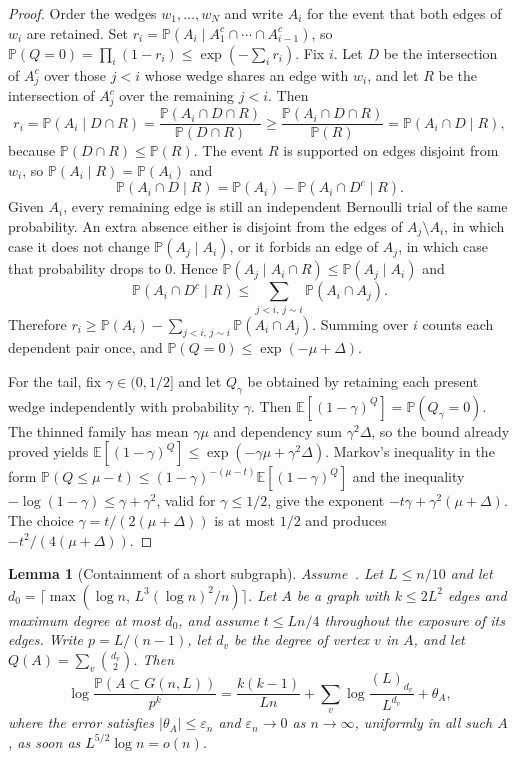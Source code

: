 \documentclass[11pt]{article}
\newtheorem{lemma}[theorem]{Lemma}
\newcommand{\EE}{\mathbb{E}}
\newcommand{\PP}{\mathbb{P}}
\begin{document}
\begin{proof}
Order the wedges \(w_1,\ldots,w_N\) and write \(A_i\) for the event that both
edges of \(w_i\) are retained. Set
\(r_i=\PP(A_i\mid A_1^c\cap\cdots\cap A_{i-1}^c)\), so
\(\PP(Q=0)=\prod_i(1-r_i)\le\exp(-\sum_i r_i)\).
Fix \(i\). Let \(D\) be the intersection of \(A_j^c\) over those \(j<i\) whose
wedge shares an edge with \(w_i\), and let \(R\) be the intersection of
\(A_j^c\) over the remaining \(j<i\). Then
\[
r_i=\PP(A_i\mid D\cap R)
=\frac{\PP(A_i\cap D\cap R)}{\PP(D\cap R)}
\ge\frac{\PP(A_i\cap D\cap R)}{\PP(R)}
=\PP(A_i\cap D\mid R),
\]
because \(\PP(D\cap R)\le\PP(R)\). The event \(R\) is supported on edges
disjoint from \(w_i\), so \(\PP(A_i\mid R)=\PP(A_i)\) and
\[
\PP(A_i\cap D\mid R)=\PP(A_i)-\PP(A_i\cap D^c\mid R).
\]
Given \(A_i\), every remaining edge is still an independent Bernoulli trial of
the same probability. An extra absence either is disjoint from the edges of
\(A_j\setminus A_i\), in which case it does not change \(\PP(A_j\mid A_i)\),
or it forbids an edge of \(A_j\), in which case that probability drops to \(0\).
Hence \(\PP(A_j\mid A_i\cap R)\le\PP(A_j\mid A_i)\) and
\[
\PP(A_i\cap D^c\mid R)
\le\sum_{j<i,\,j\sim i}\PP(A_i\cap A_j).
\]
Therefore \(r_i\ge\PP(A_i)-\sum_{j<i,\,j\sim i}\PP(A_i\cap A_j)\).
Summing over \(i\) counts each dependent pair once, and
\(\PP(Q=0)\le\exp(-\mu+\Delta)\).

For the tail, fix \(\gamma\in(0,1/2]\) and let \(Q_\gamma\) be obtained by
retaining each present wedge independently with probability \(\gamma\).
Then \(\EE[(1-\gamma)^Q]=\PP(Q_\gamma=0)\). The thinned family has mean
\(\gamma\mu\) and dependency sum \(\gamma^2\Delta\), so the bound already
proved yields \(\EE[(1-\gamma)^Q]\le\exp(-\gamma\mu+\gamma^2\Delta)\).
Markov's inequality in the form
\(\PP(Q\le\mu-t)\le(1-\gamma)^{-(\mu-t)}\EE[(1-\gamma)^Q]\) and the inequality
\(-\log(1-\gamma)\le\gamma+\gamma^2\), valid for \(\gamma\le 1/2\), give the
exponent
\(-t\gamma+\gamma^2(\mu+\Delta)\).
The choice \(\gamma=t/(2(\mu+\Delta))\) is at most \(1/2\) and produces
\(-t^2/(4(\mu+\Delta))\).
\end{proof}

\begin{lemma}[Containment of a short subgraph]
\label{lem:contain-short}
Assume~\cite[Theorem~6]{Gao20}. Let \(L\le n/10\) and let
\(d_0=\lceil\max(\log n,\, L^3(\log n)^2/n)\rceil\). Let \(A\) be a graph with
\(k\le 2L^2\) edges and maximum degree at most \(d_0\), and assume \(t\le Ln/4\)
throughout the exposure of its edges. Write \(p=L/(n-1)\), let \(d_v\) be the
degree of vertex \(v\) in \(A\), and let \(Q(A)=\sum_v\binom{d_v}{2}\). Then
\[
\log\frac{\PP(A\subset G(n,L))}{p^k}
=
\frac{k(k-1)}{Ln}+\sum_v\log\frac{(L)_{d_v}}{L^{d_v}}+\theta_A,
\]
where the error satisfies \(|\theta_A|\le\varepsilon_n\) and \(\varepsilon_n\to 0\)
as \(n\to\infty\), uniformly in all such \(A\), as soon as
\(L^{5/2}\log n=o(n)\).
\end{lemma}
\end{document}

